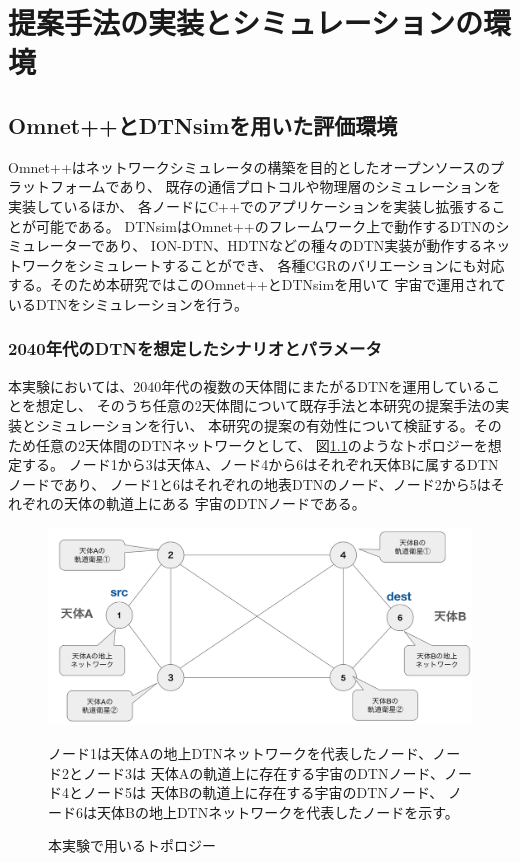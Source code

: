 \chapter{提案手法の実装とシミュレーションの環境}
\label{chap:implementation_and_experimentation}

\section{Omnet++とDTNsimを用いた評価環境}
Omnet++はネットワークシミュレータの構築を目的としたオープンソースのプラットフォームであり、
既存の通信プロトコルや物理層のシミュレーションを実装しているほか、
各ノードにC++でのアプリケーションを実装し拡張することが可能である。
DTNsimはOmnet++のフレームワーク上で動作するDTNのシミュレーターであり、
ION-DTN、HDTNなどの種々のDTN実装が動作するネットワークをシミュレートすることができ、
各種CGRのバリエーションにも対応する。そのため本研究ではこのOmnet++とDTNsimを用いて
宇宙で運用されているDTNをシミュレーションを行う。

\subsection{2040年代のDTNを想定したシナリオとパラメータ}
本実験においては、2040年代の複数の天体間にまたがるDTNを運用していることを想定し、
そのうち任意の2天体間について既存手法と本研究の提案手法の実装とシミュレーションを行い、
本研究の提案の有効性について検証する。そのため任意の2天体間のDTNネットワークとして、
図\ref{fig:experimentation_topology}のようなトポロジーを想定する。
ノード1から3は天体A、ノード4から6はそれぞれ天体Bに属するDTNノードであり、
ノード1と6はそれぞれの地表DTNのノード、ノード2から5はそれぞれの天体の軌道上にある
宇宙のDTNノードである。

\begin{figure}[tbh]
    \centering
    \includegraphics[width=0.7\textheight]{img/thesis_Sample_topology.pdf}
    \caption{本実験で用いるトポロジー}
    \label{fig:experimentation_topology}
    \begin{minipage}{\textwidth}
        \raggedright
        \vspace{3mm}
        ノード1は天体Aの地上DTNネットワークを代表したノード、ノード2とノード3は
        天体Aの軌道上に存在する宇宙のDTNノード、ノード4とノード5は
        天体Bの軌道上に存在する宇宙のDTNノード、
        ノード6は天体Bの地上DTNネットワークを代表したノードを示す。
    \end{minipage}
\end{figure}

